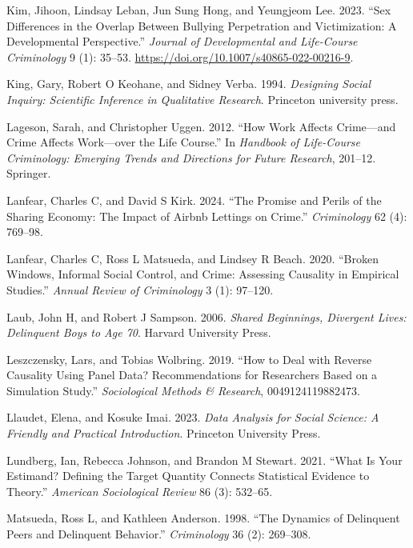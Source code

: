 \documentclass[
  letterpaper,
  DIV=11,
  numbers=noendperiod]{scrartcl}
\newlength{\cslhangindent}
\newenvironment{CSLReferences}[2] %
 {\begin{list}{}{%
  \setlength{\itemindent}{0pt}
  \setlength{\leftmargin}{0pt}
  \setlength{\parsep}{0pt}
  \ifodd #1
   \setlength{\leftmargin}{\cslhangindent}
   \setlength{\itemindent}{-1\cslhangindent}
  \fi
  \setlength{\itemsep}{#2\baselineskip}}}
 {\end{list}}
\begin{document}
\begin{CSLReferences}{1}{0}
Kim, Jihoon, Lindsay Leban, Jun Sung Hong, and Yeungjeom Lee. 2023.
{``Sex Differences in the Overlap Between Bullying Perpetration and
Victimization: A Developmental Perspective.''} \emph{Journal of
Developmental and Life-Course Criminology} 9 (1): 35--53.
\url{https://doi.org/10.1007/s40865-022-00216-9}.

King, Gary, Robert O Keohane, and Sidney Verba. 1994. \emph{Designing
Social Inquiry: Scientific Inference in Qualitative Research}. Princeton
university press.

Lageson, Sarah, and Christopher Uggen. 2012. {``How Work Affects
Crime---and Crime Affects Work---over the Life Course.''} In
\emph{Handbook of Life-Course Criminology: Emerging Trends and
Directions for Future Research}, 201--12. Springer.

Lanfear, Charles C, and David S Kirk. 2024. {``The Promise and Perils of
the Sharing Economy: The Impact of Airbnb Lettings on Crime.''}
\emph{Criminology} 62 (4): 769--98.

Lanfear, Charles C, Ross L Matsueda, and Lindsey R Beach. 2020.
{``Broken Windows, Informal Social Control, and Crime: Assessing
Causality in Empirical Studies.''} \emph{Annual Review of Criminology} 3
(1): 97--120.

Laub, John H, and Robert J Sampson. 2006. \emph{Shared Beginnings,
Divergent Lives: Delinquent Boys to Age 70}. Harvard University Press.

Leszczensky, Lars, and Tobias Wolbring. 2019. {``How to Deal with
Reverse Causality Using Panel Data? Recommendations for Researchers
Based on a Simulation Study.''} \emph{Sociological Methods \& Research},
0049124119882473.

Llaudet, Elena, and Kosuke Imai. 2023. \emph{Data Analysis for Social
Science: A Friendly and Practical Introduction}. Princeton University
Press.

Lundberg, Ian, Rebecca Johnson, and Brandon M Stewart. 2021. {``What Is
Your Estimand? Defining the Target Quantity Connects Statistical
Evidence to Theory.''} \emph{American Sociological Review} 86 (3):
532--65.

Matsueda, Ross L, and Kathleen Anderson. 1998. {``The Dynamics of
Delinquent Peers and Delinquent Behavior.''} \emph{Criminology} 36 (2):
269--308.


\end{CSLReferences}
\end{document}
